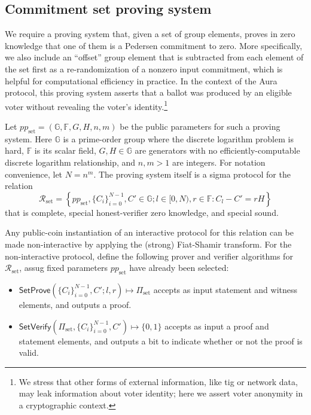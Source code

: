\documentclass{article}
\newcommand{\G}{\mathbb{G}}
\newcommand{\F}{\mathbb{F}}
\newcommand{\func}[1]{\mathsf{#1}}
\begin{document}
\subsection{Commitment set proving system}

We require a proving system that, given a set of group elements, proves in zero knowledge that one of them is a Pedersen commitment to zero.
More specifically, we also include an ``offset'' group element that is subtracted from each element of the set first as a re-randomization of a nonzero input commitment, which is helpful for computational efficiency in practice.
In the context of the Aura protocol, this proving system asserts that a ballot was produced by an eligible voter without revealing the voter's identity.\footnote{We stress that other forms of external information, like tig or network data, may leak information about voter identity; here we assert voter anonymity in a cryptographic context.}

Let $pp_{\text{set}} = (\G, \F, G, H, n, m)$ be the public parameters for such a proving system.
Here $\G$ is a prime-order group where the discrete logarithm problem is hard, $\F$ is its scalar field, $G, H \in \G$ are generators with no efficiently-computable discrete logarithm relationship, and $n, m > 1$ are integers.
For notation convenience, let $N = n^m$.
The proving system itself is a sigma protocol for the relation
$$\mathcal{R}_{\text{set}} = \left\{ pp_{\text{set}}, \{C_i\}_{i=0}^{N-1}, C' \in \G ; l \in [0,N), r \in \F : C_l - C' = rH \right\}$$
that is complete, special honest-verifier zero knowledge, and special sound.

Any public-coin instantiation of an interactive protocol for this relation can be made non-interactive by applying the (strong) Fiat-Shamir transform.
For the non-interactive protocol, define the following prover and verifier algorithms for $\mathcal{R}_{\text{set}}$, assug fixed parameters $pp_{\text{set}}$ have already been selected:
\begin{itemize}
	\item $\func{SetProve}\left( \{C_i\}_{i=0}^{N-1}, C' ; l, r \right) \mapsto \Pi_{\text{set}}$ accepts as input statement and witness elements, and outputs a proof.
	\item $\func{SetVerify}\left( \Pi_{\text{set}}, \{C_i\}_{i=0}^{N-1}, C' \right) \mapsto \{0, 1\}$ accepts as input a proof and statement elements, and outputs a bit to indicate whether or not the proof is valid.
\end{itemize}
\end{document}
